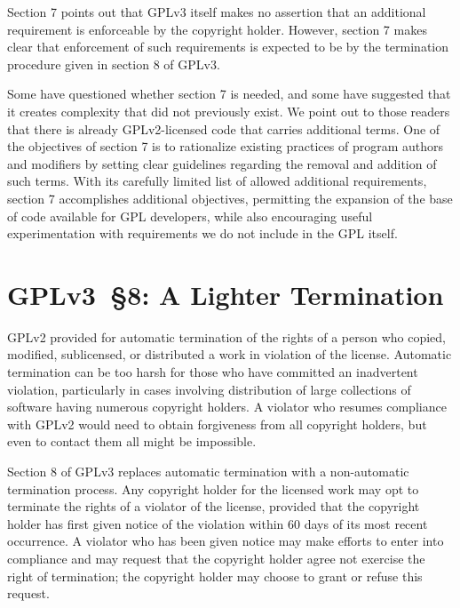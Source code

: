 
Section 7 points out that GPLv3 itself makes no assertion that an additional
requirement is enforceable by the copyright holder.  However, section 7 makes
clear that enforcement of such requirements is expected to be by the
termination procedure given in section 8 of GPLv3.


Some have questioned whether section 7 is needed, and some have suggested
that it creates complexity that did not previously exist.  We point out to
those readers that there is already GPLv2-licensed code that carries
additional terms.  One of the objectives of section 7 is to rationalize
existing practices of program authors and modifiers by setting clear
guidelines regarding the removal and addition of such terms.  With its
carefully limited list of allowed additional requirements, section 7
accomplishes additional objectives, permitting the expansion of the base of
code available for GPL developers, while also encouraging useful
experimentation with requirements we do not include in the GPL itself.

\section{GPLv3~\S8: A Lighter Termination}


GPLv2 provided for automatic termination of the rights of a person who
copied, modified, sublicensed, or distributed a work in violation of the
license.  Automatic termination can be too harsh for those who have committed
an inadvertent violation, particularly in cases involving distribution of
large collections of software having numerous copyright holders.  A violator
who resumes compliance with GPLv2 would need to obtain forgiveness from all
copyright holders, but even to contact them all might be impossible.


Section 8 of GPLv3 replaces automatic termination with a non-automatic
termination process.  Any copyright holder for the licensed work may opt to
terminate the rights of a violator of the license, provided that the
copyright holder has first given notice of the violation within 60 days of
its most recent occurrence. A violator who has been given notice may make
efforts to enter into compliance and may request that the copyright holder
agree not exercise the right of termination; the copyright holder may choose
to grant or refuse this request.

